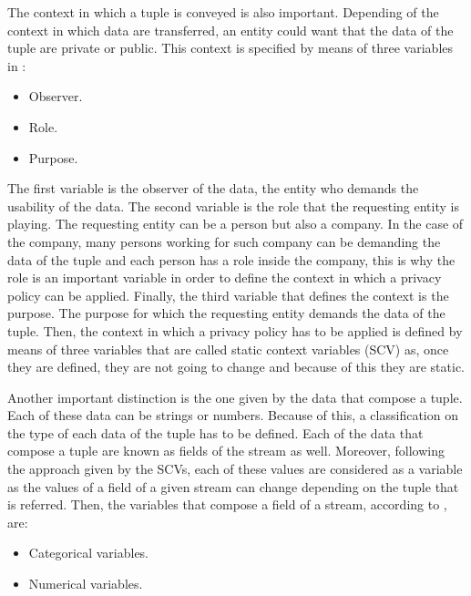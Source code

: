 The context in which a tuple is conveyed is also important. Depending of the context in which data are transferred, an entity could want that the data of the tuple are private or public. This context is specified by means of three variables in \cite{privacypoliciesarticle}:

\begin{itemize}

\item Observer.
\item Role.
\item Purpose.

\end{itemize}

The first variable is the observer of the data, the entity who demands the usability of the data. The second variable is the role that the requesting entity is playing. The requesting entity can be a person but also a company. In the case of the company, many persons working for such company can be demanding the data of the tuple and each person has a role inside the company, this is why the role is an important variable in order to define the context in which a privacy policy can be applied. Finally, the third variable that defines the context is the purpose. The purpose for which the requesting entity demands the data of the tuple. Then, the context in which a privacy policy has to be applied is defined by means of three variables that are called static context variables (SCV) as, once they are defined, they are not going to change and because of this they are static.

Another important distinction is the one given by the data that compose a tuple. Each of these data can be strings or numbers. Because of this, a classification on the type of each data of the tuple has to be defined. Each of the data that compose a tuple are known as fields of the stream as well. Moreover, following the approach given by the SCVs, each of these values are considered as a variable as the values of a field of a given stream can change depending on the tuple that is referred. Then, the variables that compose a field of a stream, according to \cite{privacypoliciesarticle}, are:

\begin{itemize}

\item Categorical variables.
\item Numerical variables.

\end{itemize}

